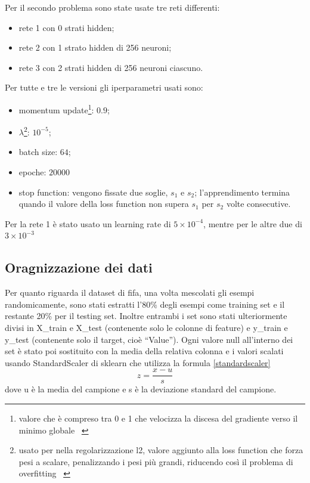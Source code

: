 \documentclass[12pt]{report}
\begin{document}
Per il secondo problema sono state usate tre reti differenti:
\begin{itemize}
\item{rete 1 con 0 strati hidden};
\item{rete 2 con 1 strato hidden di 256 neuroni};
\item{rete 3 con 2 strati hidden di 256 neuroni ciascuno}.
\end{itemize}

Per tutte e tre le versioni gli iperparametri usati sono:
\begin{itemize}
\item{momentum update}\footnote{valore che è compreso tra 0 e 1 che velocizza la discesa del gradiente verso il minimo globale ~\cite{Momentum}}: $0.9$;
\item{$\lambda$}\footnote{usato per nella regolarizzazione l2, valore aggiunto alla loss function che forza pesi a scalare, penalizzando i pesi più grandi, riducendo così il problema di overfitting ~\cite{L2}}: $10^{-5}$;
\item{batch size}: $64$;
\item{epoche}: $20000$
\item{stop function}: vengono fissate due soglie, $s_1$ e $s_2$; l'apprendimento termina quando il valore della loss function non supera $s_1$ per $s_2$ volte consecutive.
\end{itemize}
Per la rete 1 è stato usato un learning rate di $5 \times 10^{-4}$, mentre per le altre due di $3 \times 10^{-3}$

\subsection{Oragnizzazione dei dati}
Per quanto riguarda il dataset di fifa, una volta mescolati gli esempi randomicamente, sono stati estratti l'80\% degli esempi come training set e il restante 20\% per il testing set. Inoltre entrambi i set sono stati ulteriormente divisi in X\_train e X\_test (contenente solo le colonne di feature) e y\_train e y\_test (contenente solo il target, cioè “Value”). Ogni valore null all’interno dei set è stato poi sostituito con la media della relativa colonna e i valori scalati usando StandardScaler di sklearn che utilizza la formula \eqref{standardscaler}
\begin{equation}
z = \frac{x - u}{s}
\label{standardscaler}
\end{equation}
dove u è la media del campione e s è la deviazione standard del campione.
\end{document}
